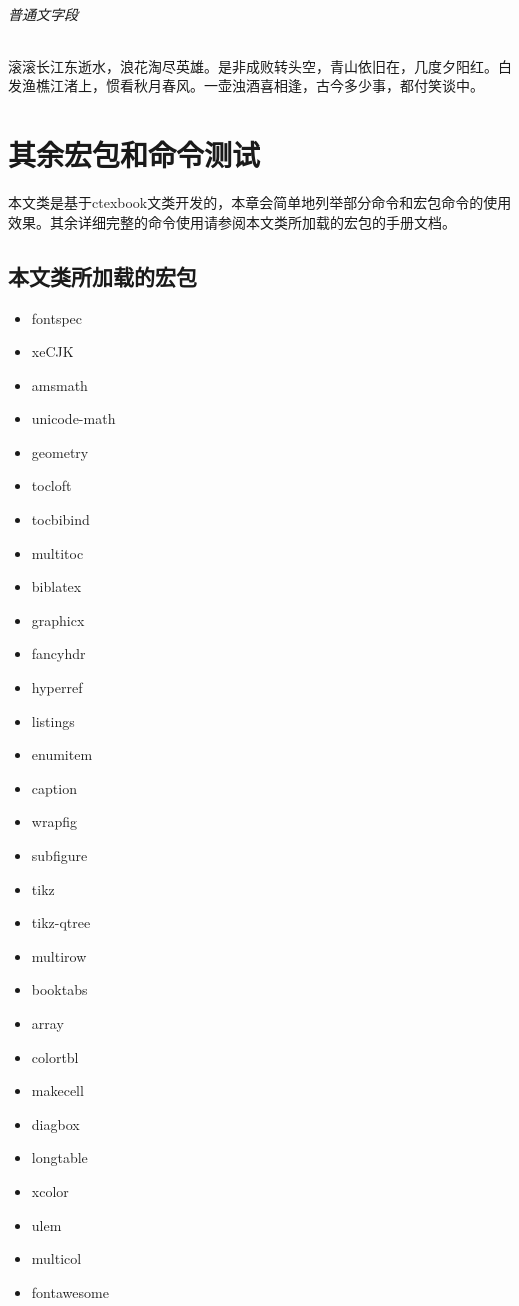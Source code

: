 \documentclass{../../PublicResources/DocClass}
\begin{document}
    \subparagraph{普通文字段} 滚滚长江东逝水，浪花淘尽英雄。是非成败转头空，青山依旧在，几度夕阳红。白发渔樵江渚上，惯看秋月春风。一壶浊酒喜相逢，古今多少事，都付笑谈中。

    \chapter{其余宏包和命令测试}
    \begin{intro}
        本文类是基于ctexbook文类开发的，本章会简单地列举部分命令和宏包命令的使用效果。其余详细完整的命令使用请参阅本文类所加载的宏包的手册文档。
    \end{intro}

    \section{本文类所加载的宏包}
    \begin{multicols}{4}
        \begin{itemize}
            \item fontspec
            \item xeCJK
            \item amsmath
            \item unicode-math
            \item geometry
            \item tocloft
            \item tocbibind
            \item multitoc
            \item biblatex
            \item graphicx
            \item fancyhdr
            \item hyperref
            \item listings
            \item enumitem
            \item caption
            \item wrapfig
            \item subfigure
            \item tikz
            \item tikz-qtree
            \item multirow
            \item booktabs
            \item array
            \item colortbl
            \item makecell
            \item diagbox
            \item longtable
            \item xcolor
            \item ulem
            \item multicol
            \item fontawesome
        \end{itemize}
    \end{multicols}
\end{document}
